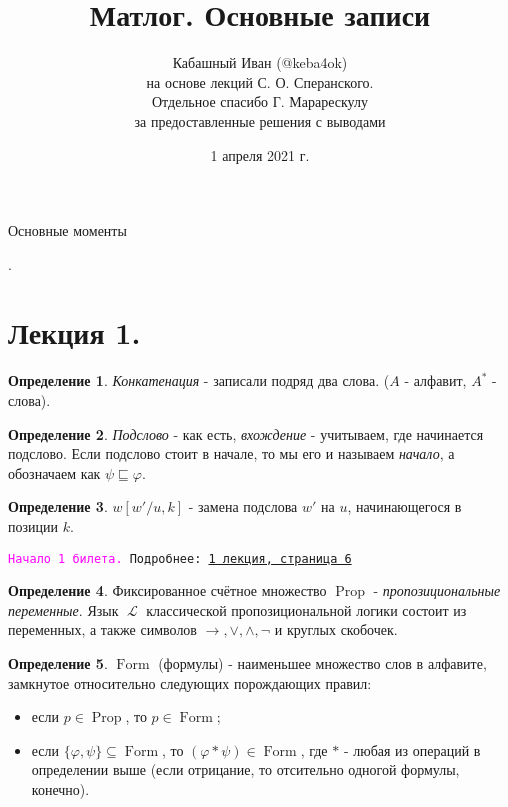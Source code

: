 \documentclass[a4paper,100pt]{article}
\title{Матлог. Основные записи}
\author{Кабашный Иван (@keba4ok) \\ на основе лекций С. О. Сперанского. \\ Отдельное спасибо Г. Марарескулу \\ за предоставленные решения с выводами}
\date{1 апреля 2021 г.}
\theoremstyle{indented}
\theoremstyle{definition}
\newtheorem{defn}{Определение}
\theoremstyle{remark}
\DeclareMathOperator{\Prop}{Prop}
\DeclareMathOperator{\LL}{\mathscr{L}}
\DeclareMathOperator{\form}{Form}
\begin{document}
\newcommand{\resetexlcounters}{%
  \setcounter{exl}{0}%
} 

\newcommand{\resetremarkcounters}{%
  \setcounter{remark}{0}%
} 

\newcommand{\reseconscounters}{%
  \setcounter{cons}{0}%
} 

\newcommand{\resetall}{%
    \resetexlcounters
    \resetremarkcounters
    \reseconscounters%
}

\maketitle 

\newpage

\hypertarget{t1}{Основные моменты}. 
\tableofcontents

\newpage

\section{Лекция 1.}

\begin{defn}
  \textit{Конкатенация} - записали подряд два слова. ($A$ - алфавит, $A^*$ - слова).
\end{defn}

\begin{defn}
  \textit{Подслово} - как есть, \textit{вхождение} - учитываем, где начинается подслово. Если подслово стоит в начале, то мы его и называем \textit{начало}, а обозначаем как $\psi \sqsubseteq \varphi$.
\end{defn}

\begin{defn}
  $w[w'/u, k]$ - замена подслова $w'$ на $u$, начинающегося в позиции $k$.
\end{defn}

\hrulefill

\texttt{\hypertarget{b1}{\textcolor{magenta}{Начало 1 билета.}} Подробнее: \href{http://www.mi-ras.ru/~speranski/courses/logic-1-2021-spring/slides_1.pdf}{1 лекция, страница 6}} 

\begin{defn}
  Фиксированное счётное множество $\Prop$ - \textit{пропозициональные переменные}. Язык $\LL$ классической пропозициональной логики состоит из переменных, а также символов $\rightarrow, \vee, \wedge, \neg$ и круглых скобочек.
\end{defn}

\begin{defn}
  $\form$ (формулы) - наименьшее множество слов в алфавите, замкнутое относительно следующих порождающих правил:
  \begin{itemize}
    \item если $p\in \Prop$, то $p\in \form$; 
    \item если $\{\varphi, \psi\}\subseteq \form$, то $(\varphi*\psi)\in \form$, где $*$ - любая из операций в определении выше (если отрицание, то отсительно одногой формулы, конечно).
  \end{itemize}
\end{defn}
\end{document}
